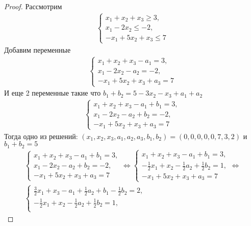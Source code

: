 \begin{proof}
    Рассмотрим
    \begin{gather*}
    \begin{cases}
        x_1 + x_2 + x_3 \geq 3, \\
        x_1 - 2x_2 \leq -2, \\
        -x_1 + 5x_2 + x_3 \leq 7
    \end{cases}
    \end{gather*}
    Добавим переменные
    \begin{gather*}
    \begin{cases}
        x_1 + x_2 + x_3 - a_1 = 3, \\
        x_1 - 2x_2 - a_2 = -2, \\
        -x_1 + 5x_2 + x_3 + a_3 = 7
    \end{cases}
    \end{gather*}
    И еще 2 переменные такие что $b_1 + b_2 = 5 - 3x_2 - x_3 + a_1 + a_2$
    \begin{gather*}
    \begin{cases}
        x_1 + x_2 + x_3 - a_1 + b_1 = 3,\\
        x_1 - 2x_2 - a_2 + b_2 = -2,\\
        -x_1 + 5x_2 + x_3 + a_3 = 7
    \end{cases}
    \end{gather*}
    Тогда одно из решений: $(x_1, x_2, x_3, a_1, a_2, a_3, b_1, b_2) = (0, 0, 0, 0, 0, 7, 3, 2)$ и $b_1 + b_2 = 5$
    \begin{gather*}
    \begin{cases}
        x_1 + x_2 + x_3 - a_1 + b_1 = 3,\\
        x_1 - 2x_2 - a_2 + b_2 = -2,\\
        -x_1 + 5x_2 + x_3 + a_3 = 7
    \end{cases}
    \Leftrightarrow
    \begin{cases}
        x_1 + x_2 + x_3 - a_1 + b_1 = 3,\\
        -\frac{1}{2}x_1 + x_2 - \frac{1}{2}a_2 + \frac{1}{2}b_2 = 1,\\
        -x_1 + 5x_2 + x_3 + a_3 = 7
    \end{cases}
    \Leftrightarrow\\
    \begin{cases}
        \frac{3}{2}x_1 + x_3 - a_1 + \frac{1}{2}a_2 + b_1 - \frac{1}{2}b_2 = 2,\\
        -\frac{1}{2}x_1 + x_2 - \frac{1}{2}a_2 + \frac{1}{2}b_2 = 1,\\

\end{cases}
\end{gather*}
\end{proof}
